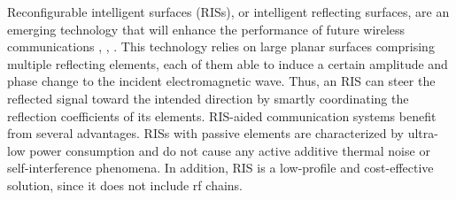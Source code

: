 \documentclass[twocolumn,10pt]{IEEEtran}
\begin{document}
Reconfigurable intelligent surfaces (RISs), or intelligent reflecting surfaces, are an emerging technology that will enhance the performance of future wireless communications \cite{bas19}, \cite{wu19a}, \cite{liu21}.
This technology relies on large planar surfaces comprising multiple reflecting elements, each of them able to induce a certain amplitude and phase change to the incident electromagnetic wave.
Thus, an RIS can steer the reflected signal toward the intended direction by smartly coordinating the reflection coefficients of its elements.
RIS-aided communication systems benefit from several advantages.
RISs with passive elements are characterized by ultra-low power consumption and do not cause any active additive thermal noise or self-interference phenomena.
In addition, RIS is a low-profile and cost-effective solution, since it does not include \gls{rf} chains.
\end{document}
